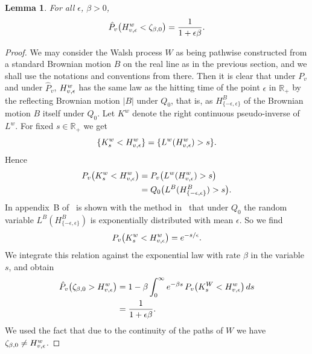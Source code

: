 \documentclass[11pt,a4paper]{amsart}
\newcommand{\gb}{\beta}
\newcommand{\gep}{\epsilon}
\newcommand{\1}{1}
\newcommand{\R}{\mathbb{R}}
\newtheorem{lemma}[theorem]{Lemma}
\theoremstyle{remark}
\newcommand{\TW}{\ensuremath H^w}
\newcommand{\hP}{\ensuremath{\hat P}}
\numberwithin{equation}{section}
\begin{document}
\begin{lemma}   \label{lem3.1}
For all $\gep$, $\gb>0$,
\begin{equation}    \label{eq3.2}
    \hP_v\bigl(\TW_{v,\gep} < \zeta_{\gb,0}\bigr) = \frac{1}{1+\gep\gb}.
\end{equation}
\end{lemma}

\begin{proof}
We may consider the Walsh process $W$ as being pathwise constructed from a standard
Brownian motion $B$ on the real line as in the previous section, and we shall use
the notations and conventions from there. Then it is clear that under $P_v$ and
under $\hP_v$, $\TW_{v,\gep}$ has the same law as the hitting time of the point
$\gep$ in $\R_+$ by the reflecting Brownian motion $|B|$ under $Q_0$, that is, as
$H^B_{\{-\gep,\gep\}}$ of the Brownian motion $B$ itself under $Q_0$. Let $K^w$ denote
the right continuous pseudo-inverse of $L^w$. For fixed $s\in\R_+$ we get
\begin{equation*}
    \{K^w_s < \TW_{v,\gep}\} = \{L^w(\TW_{v,\gep})>s\}.
\end{equation*}
Hence
\begin{align*}
    P_v\bigl(K^w_s < \TW_{v,\gep}\bigr)
        &= P_v\bigl(L^w(\TW_{v,\gep})>s\bigr)\\
        &= Q_0\bigl(L^B(H^B_{\{-\gep,\gep\}})>s\bigr).
\end{align*}
In appendix~B of~\cite{BMMG0} is shown with the method
in~\cite[Section~6.4]{KaSh91} that under $Q_0$ the random variable
$L^B(H^B_{\{-\gep,\gep\}})$ is exponentially distributed with mean $\gep$. So we find
\begin{equation*}
    P_v\bigl(K^w_s < \TW_{v,\gep}\bigr) = e^{-s/\gep}.
\end{equation*}
We integrate this relation against the exponential law with rate $\gb$ in the variable $s$,
and obtain
\begin{align*}
    \hP_v\bigl(\zeta_{\gb,0}>\TW_{v,\gep}\bigr)
        &= 1 - \gb\int_0^\infty e^{-\gb s}\,P_v\bigl(K^W_s < \TW_{v,\gep}\bigr)\,ds\\
        &= \frac{1}{1+\gep\gb}.
\end{align*}
We used the fact that due to the continuity of the paths of $W$ we have
$\zeta_{\gb,0}\ne \TW_{v,\gep}$.
\end{proof}
\end{document}
